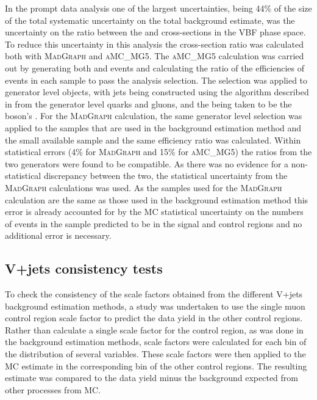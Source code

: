 In the prompt data analysis one of the largest uncertainties, being 44\% of the size of the total systematic uncertainty on the total background estimate, was the uncertainty on the ratio between the \Zmumu and \Znunu cross-sections in the \ac{VBF} phase space. To reduce this uncertainty in this analysis the cross-section ratio was calculated both with \textsc{MadGraph} and \textsc{aMC\@NLO\_MG5}. The \textsc{aMC\@NLO\_MG5} calculation was carried out by generating both \Zmumu and \Znunu events and calculating the ratio of the efficiencies of events in each sample to pass the analysis selection. The selection was applied to generator level objects, with jets being constructed using the algorithm described in  from the generator level quarks and gluons, and the \MET being taken to be the \PZ boson's \pt. For the \textsc{MadGraph} calculation, the same generator level selection was applied to the \Zmumu samples that are used in the background estimation method and the small available \Znunu sample and the same efficiency ratio was calculated. Within statistical errors (4\% for \textsc{MadGraph} and 15\% for \textsc{aMC\@NLO\_MG5}) the ratios from the two generators were found to be compatible. As there was no evidence for a non-statistical discrepancy between the two, the statistical uncertainty from the \textsc{MadGraph} calculations was used. As the samples used for the \textsc{MadGraph} calculation are the same as those used in the background estimation method this error is already accounted for by the \ac{MC} statistical uncertainty on the numbers of events in the \Zmumu sample predicted to be in the signal and control regions and no additional error is necessary.

\subsection{V+jets consistency tests}
\label{sec:parkedclosure}
To check the consistency of the scale factors obtained from the different V+jets background estimation methods, a study was undertaken to use the single muon control region scale factor to predict the data yield in the other control regions. Rather than calculate a single scale factor for the control region, as was done in the background estimation methods, scale factors were calculated for each bin of the distribution of several variables. These scale factors were then applied to the \ac{MC} estimate in the corresponding bin of the other control regions. The resulting estimate was compared to the data yield minus the background expected from other processes from \ac{MC}.

